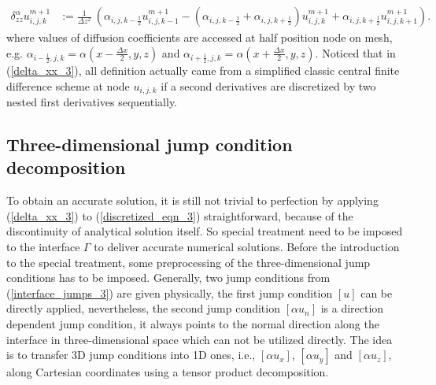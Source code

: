 \documentclass[dissertation]{uathesis}
\begin{document}
\begin{body}
\begin{flushleft}
\begin{eqnarray}
\delta_{zz}^{\alpha} u^{m+1}_{i,j,k} &:= 
\frac{1}{\Delta z^{2}} ~ (\alpha_{i,j,k-\frac{1}{2}} u^{m+1}_{i,j,k-1} - (\alpha_{i,j,k-\frac{1}{2}} + \alpha_{i,j,k+\frac{1}{2}}) u^{m+1}_{i,j,k} + \alpha_{i,j,k+\frac{1}{2}} u^{m+1}_{i,j,k+1}).	\nonumber
\end{eqnarray}
%
where values of diffusion coefficients are accessed at half position node on mesh, e.g. $\alpha_{i-\frac{1}{2},j,k}=\alpha (x-\frac{\Delta x}{2},y,z)$ and $\alpha_{i+\frac{1}{2},j,k}=\alpha (x+\frac{\Delta x}{2},y,z)$. Noticed that in (\ref{delta_xx_3}),  all definition actually came from a simplified classic central finite difference scheme at node $u_{i,j,k}$ if a second derivatives are discretized by two nested first derivatives sequentially. 

\subsection{Three-dimensional jump condition decomposition}
\hspace{1cm} To obtain an accurate solution, it is still not trivial to perfection by applying (\ref{delta_xx_3}) to (\ref{discretized_eqn_3}) straightforward, because of the discontinuity of analytical solution itself. So special treatment need to be imposed to the interface $\Gamma$ to deliver accurate numerical solutions. Before the introduction to the special treatment, some preprocessing of the three-dimensional jump conditions has to be imposed. Generally, two jump conditions from (\ref{interface_jumps_3}) are given physically, the first jump condition $[u]$ can be directly applied, nevertheless, the second jump condition $[\alpha u_n]$ is a direction dependent jump condition, it always points to the normal direction along the interface in three-dimensional space which can not be utilized directly. The idea is to transfer 3D jump conditions into 1D ones, i.e., $[\alpha u_{x}]$, $[\alpha u_{y}]$ and $[\alpha u_{z}]$, along Cartesian coordinates using a tensor product decomposition.


\end{flushleft}
\end{body}
\end{document}
